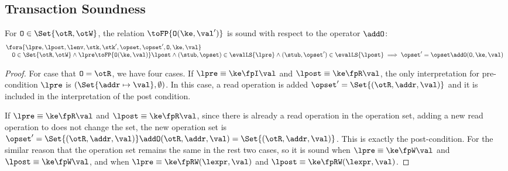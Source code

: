 \subsection{Transaction Soundness}

\begin{lemma}
\label{lem:fingerprint-op}
For \( \mathtt{O} \in \Set{\otR, \otW} \), the relation \( \toFP{\mathtt{O}(\ke,\val')}\) is sound with respect to the operator \( \addO \):
\[
\begin{array}{@{}l}
    \fora{\lpre, \lpost, \lenv, \stk, \stk', \opset, \opset', \mathtt{O}, \ke, \val} \\
    \quad \mathtt{O} \in \Set{\otR, \otW} 
    \land \lpre \toFP{\mathtt{O}(\ke,\val)} \lpost
    \land (\stub, \opset) \in \evalLS{\lpre}
    \land (\stub, \opset') \in \evalLS{\lpost}
    \implies \opset' = \opset \addO (\mathtt{O}, \ke, \val)
\end{array}
\]
\end{lemma}
\begin{proof}
For case that \( \mathtt{O} = \otR\), we have four cases.
If \( \lpre \equiv \ke \fpI \val \) and \( \lpost \equiv \ke \fpR \val \), the only interpretation for pre-condition \( \lpre \) is \( (\Set{\addr \mapsto \val}, \emptyset) \).
In this case, a read operation is added \( \opset' = \Set{(\otR, \addr, \val)} \) and it is included in the interpretation of the post condition.

If \( \lpre \equiv \ke \fpR \val \) and \( \lpost \equiv \ke \fpR \val \), since there is already a read operation in the operation set, adding a new read operation to does not change the set, \ie the new operation set  is \( \opset' = \Set{(\otR, \addr, \val)} \addO (\otR, \addr, \val ) = \Set{(\otR, \addr, \val)} \).
This is exactly the post-condition.
For the similar reason that the operation set remains the same in the rest two cases, so it is sound when \( \lpre \equiv \ke \fpW \val \) and \( \lpost \equiv \ke \fpW \val \), and when \( \lpre \equiv \ke \fpRW (\lexpr,\val) \) and \( \lpost \equiv \ke \fpRW (\lexpr,\val) \).
\end{proof}

